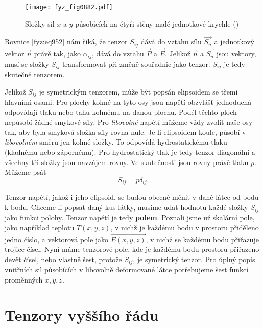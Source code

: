 {    \begin{figure}[ht!] %
      \centering
      \texttt{[image: fyz\_fig0882.pdf]}
      \caption{Složky sil \(x\) a \(y\) působících na čtyři stěny malé jednotkové krychle
               (\cite[s.~586]{Feynman02})}
      \label{fyz:fig0882}
    \end{figure}

    Rovnice \eqref{fyz:eq952} nám říká, že tenzor \(S_{ij}\) dává do vztahu sílu \(\vec{S_n}\) a
    jednotkový vektor \(\vec{n}\) právě tak, jako \(\alpha_{ij}\), dává do vztahu \(\vec{P}\) a
    \(\vec{E}\). Jelikož \(\vec{n}\) a \(\vec{S_n}\) jsou vektory, musí se složky \(S_{ij}\)
    transformovat při změně souřadnic jako tenzor. \(S_{ij}\) je tedy skutečně tenzorem.

    Jelikož \(S_{ij}\) je symetrickým tenzorem, může být popsán elipsoidem se třemi hlavními osami.
    Pro plochy kolmé na tyto osy jsou napětí obzvlášť jednoduchá - odpovídají tlaku nebo tahu
    kolmému na danou plochu. Podél těchto ploch nepůsobí žádné smykové síly. Pro \emph{libovolné}
    napětí můžeme vždy zvolit naše osy tak, aby byla smyková složka síly rovna nule. Je-li
    elipsoidem koule, působí v \emph{libovolném} směru jen kolmé složky. To odpovídá hydrostatickému
    tlaku (kladnému nebo zápornému). Pro hydrostatický tlak je tedy tenzor diagonální a všechny tři
    složky jsou navzájem rovny. Ve skutečnosti jsou rovny právě tlaku \(p\). Můžeme psát
    \begin{equation}\label{fyz:eq953}
      S_{ij}=p\delta_{ij}.
    \end{equation}

    Tenzor napětí, jakož i jeho elipsoid, se budou obecně měnit v dané látce od bodu k bodu.
    Chceme-li popsat daný kus látky, musíme udat hodnotu každé složky \(S_{ij}\) jako funkci polohy.
    Tenzor napětí je tedy \textbf{polem}. Poznali jsme už skalární pole, jako například teplotu
    \(T(x,y,z)\), v nichž je každému bodu v prostoru přiděleno jedno číslo, a vektorová pole jako
    \(\vec{E(x,y,z)}\), v nichž se každému bodu přiřazuje trojice čísel. Nyní máme tenzorové pole,
    kde je každému bodu prostoru přiřazeno devět čísel, nebo vlastně šest, protože \(S_{ij}\), je
    symetrický tenzor. Pro úplný popis vnitřních sil působících v libovolně deformované látce
    potřebujeme šest funkcí proměnných \(x, y, z\).
 
  \section{Tenzory vyššího řádu}\label{fyz:IIchapXXXIsecVII}
    
}
